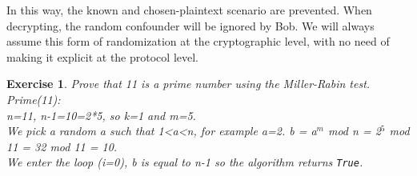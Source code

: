 \documentclass[a4paper, 12pt]{report}
\newtheorem{exercise}{\textbf{Exercise}}
\begin{document}
In this way, the known and chosen-plaintext scenario are prevented. When decrypting, the random confounder will be ignored by Bob. We will always assume this form of randomization at the cryptographic level, with no need of making it explicit at the protocol level.

\begin{exercise}
	Prove that 11 is a prime number using the Miller-Rabin test.\\
	
	Prime(11):\\
	n=11, n-1=10=2*5, so k=1 and m=5.\\
	We pick a random a such that 1<a<n, for example a=2.
	b = a$^m$ mod n = 2$^5$ mod 11 = 32 mod 11 = 10.\\
	We enter the loop (i=0), b is equal to n-1 so the algorithm returns \texttt{True}.
\end{exercise} 
\end{document}
